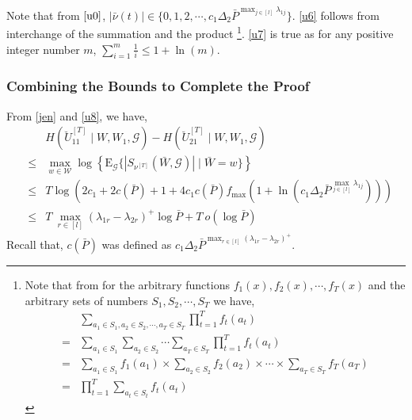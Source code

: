 \documentclass[11pt]{article}
\begin{document}
Note that from $\eqref{u0}$, $|\bar{\nu}(t)|\in \{0,1,2,\cdots,c_1\Delta_2\bar{P}^{\max_{j\in[l]}\lambda_{1j}}\}$. \eqref{u6}  follows from interchange of the summation and the product \footnote{ Note that from \cite{Arash_Jafar_sumset} for the arbitrary functions $f_1(x),f_2(x),\cdots,f_T(x)$ and the arbitrary sets of numbers $S_1,S_2,\cdots,S_T$ we have,
\begin{align}
&\sum_{a_1\in S_1,a_2\in S_2,\cdots,a_T\in S_T}\prod_{t=1}^Tf_t(a_t)\nonumber\\
=&\sum_{a_1\in S_1}\sum_{a_2\in S_2}\cdots\sum_{a_T\in S_T}\prod_{t=1}^Tf_t(a_t)\\
=&\sum_{a_1\in S_1}f_1(a_1)\times\sum_{a_2\in S_2}f_2(a_2)\times\cdots\times\sum_{a_T\in S_T}f_T(a_T)\label{ret}\\
=&\prod_{t=1}^T\sum_{a_t\in S_t}f_t(a_t)
\end{align}}. \eqref{u7} is true as  for any positive integer number $m$, $\sum_{i=1}^m\frac{1}{i}\le1+\ln(m)$.
\subsubsection{Combining the Bounds to Complete the Proof}
From \eqref{jen} and \eqref{u8}, we have,
\begin{eqnarray}
&&H(\breve{U}_{11}^{[T]}\mid W,W_1,\mathcal{G})-H(\breve{U}_{21}^{[T]}\mid W,W_1,\mathcal{G})\nonumber\\
&\le&\max_{w\in\mathcal{W}}\log{\left\{\mbox{E}_{\mathcal{G}}\{|S_{\nu^{[T]}}(\bar{W},\mathcal{G})|\mid \bar{W}=w\}\right\}}\\
&\le&T\log{\left(2c_1+2c(\bar{P})+1+4c_1c(\bar{P})f_{\max}\left(1+\ln\left(c_1\Delta_2\bar{P}^{\max_{j\in[l]}\lambda_{1j}}\right)\right)\right)}\\
&\le&T~{\max_{r\in[l]}(\lambda_{1r}-\lambda_{2r})^+}\log{\bar{P}}+T~o(\log{\bar{P}})
\end{eqnarray}
Recall that, $c(\bar{P})$ was defined as  $c_1\Delta_2\bar{P}^{\max_{r\in[l]}(\lambda_{1r}-\lambda_{2r})^+}$.






\end{document}
